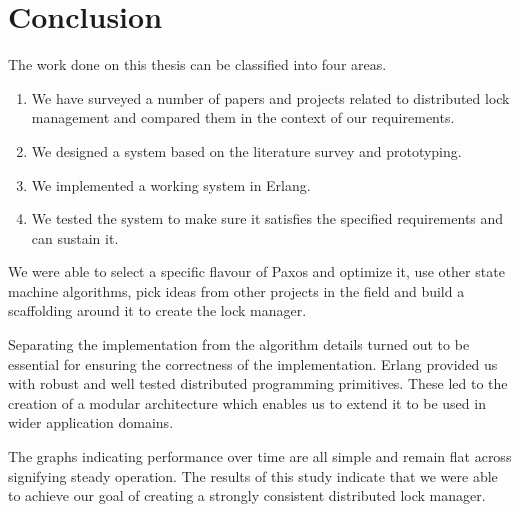 \chapter{Conclusion}
\label{chapter:conclusion}

The work done on this thesis can be classified into four areas.

\begin{enumerate}
  \item We have surveyed a number of papers and projects related to distributed
    lock management and compared them in the context of our requirements.
  \item We designed a system based on the literature survey and prototyping.
  \item We implemented a working system in Erlang.
  \item We tested the system to make sure it satisfies the specified
    requirements and can sustain it.
\end{enumerate}

We were able to select a specific flavour of Paxos and optimize it, use other
state machine algorithms, pick ideas from other projects in the field and build
a scaffolding around it to create the lock manager.

Separating the implementation from the algorithm details turned out
to be essential for ensuring the correctness of the implementation. Erlang
provided us with robust and well tested distributed programming primitives.
These led to the creation of a modular architecture which enables us to extend
it to be used in wider application domains.

The graphs indicating performance over time are all simple and remain flat
across signifying steady operation. The results of this study indicate that
we were able to achieve our goal of creating a strongly consistent
distributed lock manager.

